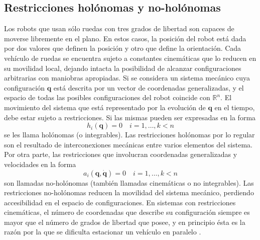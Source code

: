 \subsection{Restricciones holónomas y no-holónomas}
\label{ssec:rnh}
Los robots que usan sólo ruedas con tres grados de libertad son capaces de moverse libremente en el plano. En estos casos, la posición del robot está dada por dos valores que definen la posición y otro que define la orientación. Cada vehículo de ruedas se encuentra sujeto a constantes cinemáticas que lo reducen en su movilidad local, dejando intacta la posibilidad de alcanzar configuraciones arbitrarias con maniobras apropiadas. Si se considera un sistema mecánico cuya configuración $\mathbf{q}$ está descrita por un vector de coordenadas generalizadas, y el espacio de todas las posibles configuraciones del robot coincide con $\mathds{R}^{n}$. El movimiento del sistema que está representado por la evolución de $\mathbf{q}$ en el tiempo, debe estar sujeto a restricciones. Si las mismas pueden ser expresadas en la forma 
\[h_{i}(\mathbf{q})=0\quad i=1, \dots,k<n\]
se les llama holónomas (o integrables). Las restricciones holónomas por lo regular son el resultado de interconexiones mecánicas entre varios elementos del sistema. Por otra parte, las restricciones que involucran coordenadas generalizadas y velocidades en la forma
\[a_{i}(\mathbf{q}, \mathbf{\dot{q}})=0\quad i=1,\dots,k<n\]
son llamadas no-holónomas (también llamadas cinemáticas o no integrables). Las restricciones no-holónomas reducen la movilidad del sistema mecánico, perdiendo accesibilidad en el espacio de configuraciones. En sistemas con restricciones cinemáticas, el número de coordenadas que describe su configuración siempre es mayor que el número de grados de libertad que posee, y en principio ésta es la razón por la que se dificulta estacionar un vehículo en paralelo \cite{sicilianoRoboticsModellingPlanning2009}.
